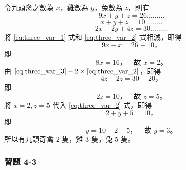\begin{solution*}
令九頭禽之數為 $x$，雞數為 $y$，兔數為 $z$，則有
\begin{equation}\label{eq:three_var_1}
  9x + y + z = 26 \dots\dots\dots
\end{equation}
\begin{equation}\label{eq:three_var_2}
  x + y + z = 10 \dots\dots\dots
\end{equation}
\begin{equation}\label{eq:three_var_3}
  2x + 2y + 4z = 30 \dots\dots\dots
\end{equation}
將 \eqref{eq:three_var_1} 式和 \eqref{eq:three_var_2} 式相減，即得
\begin{equation*}
  9x - x = 26 - 10 \text{，}
\end{equation*}
即
\begin{equation*}
  8x = 16 \text{，} \quad \text{故 } x=2 \text{。}
\end{equation*}
由 $\eqref{eq:three_var_3} - 2 \times \eqref{eq:three_var_2}$，即得
\begin{equation*}
  4z - 2z = 30 - 20 \text{，}
\end{equation*}
即
\begin{equation*}
  2z = 10 \text{，} \quad \text{故 } z=5 \text{。}
\end{equation*}
將 $x=2, z=5$ 代入 \eqref{eq:three_var_2} 式，即得
\begin{equation*}
  2 + y + 5 = 10 \text{，}
\end{equation*}
即
\begin{equation*}
  y = 10 - 2 - 5 \text{，} \quad \text{故 } y=3 \text{。}
\end{equation*}
所以有九頭奇禽 $2$ 隻，雞 $3$ 隻，兔 $5$ 隻。
\end{solution*}

\subsubsection*{習題 4-3}\label{sec:ex4-3}

